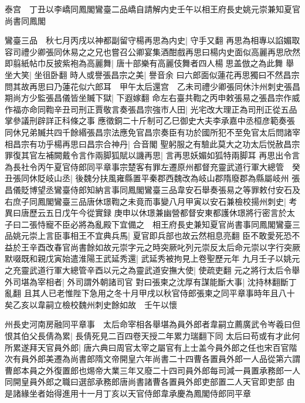 泰宫　丁丑以李嶠同鳳閣鸞臺二品嶠自請解内史壬午以相王府長史姚元崇兼知夏官尚書同鳳閣

鸞臺三品　秋七月丙戌以神都副留守楊再思為内史|{
	守手又翻}
再思為相專以諂媚取容司禮少卿張同休易之之兄也嘗召公卿宴集酒酣戲再思曰楊内史面似高麗再思欣然即翦紙帖巾反披紫袍為高麗舞|{
	唐十部樂有高麗伎舞者四人楊思盖倣之為此舞}
舉坐大笑|{
	坐徂卧翻}
時人或譽張昌宗之美|{
	譽音余}
曰六郎面似蓮花再思獨曰不然昌宗問其故再思曰乃蓮花似六郎耳　甲午太后還宫　乙未司禮少卿張同休汴州刺史張昌期尚方少監張昌儀皆坐贓下獄|{
	下遐嫁翻}
命左右臺共鞫之丙申敕張易之張昌宗作威作福亦命同鞫辛丑司刑正賈敬言奏張昌宗強市人田|{
	光宅改大理正為司刑正從五品掌參議刑辟詳正科條之事}
應徵銅二十斤制可乙巳御史大夫李承嘉中丞桓彦範奏張同休兄弟贓共四千餘緡張昌宗法應免官昌宗奏臣有功於國所犯不至免官太后問諸宰相昌宗有功乎楊再思曰昌宗合神丹|{
	合音閣}
聖躬服之有驗此莫大之功太后悦赦昌宗罪復其官左補闕戴令言作兩脚狐賦以譏再思|{
	言再思妖媚如狐特兩脚耳}
再思出令言為長社令丙午夏官侍郎同平章事宗楚客有罪左遷原州都督充靈武道行軍大總管　癸丑張同休貶岐山丞|{
	後魏分扶風雍縣置平秦郡西魏改為岐山郡隋廢郡為縣屬岐州}
張昌儀貶博望丞鸞臺侍郎知納言事同鳳閣鸞臺三品韋安石舉奏張易之等罪敕付安石及右庶子同鳳閣鸞臺三品唐休璟鞫之未竟而事變八月甲寅以安石兼檢校揚州刺史|{
	考異曰唐歷云五日戊午今從實録}
庚申以休璟兼幽營都督安東都護休璟將行密言於太子曰二張恃寵不臣必將為亂殿下宜備之　相王府長史兼知夏官尚書事同鳳閣鸞臺三品姚元崇上言臣事相王不宜典兵馬|{
	夏官即兵部也故云然相息亮翻}
臣不敢愛死恐不益於王辛酉改春官尚書餘如故元崇字元之時突厥叱列元崇反太后命元崇以字行突厥默啜既和親戊寅始遣淮陽王武延秀還|{
	武延秀被拘見上卷聖歷元年}
九月壬子以姚元之充靈武道行軍大總管辛酉以元之為靈武道安撫大使|{
	使疏吏翻}
元之將行太后令舉外司堪為宰相者|{
	外司謂外朝諸司官}
對曰張柬之沈厚有謀能斷大事|{
	沈持林翻斷丁亂翻}
且其人已老惟陛下急用之冬十月甲戌以秋官侍郎張柬之同平章事時年且八十矣乙亥以韋嗣立檢校魏州刺史餘如故　壬午以懷

州長史河南房融同平章事　太后命宰相各舉堪為員外郎者韋嗣立薦廣武令岑羲曰但恨其伯父長倩為累|{
	長倩死見二百四卷天授二年累力瑞翻下同}
太后曰苟或有才此何所累遂拜天官員外郎|{
	唐六典曰周官太宰之屬官有上士盖今員外郎之任也宋百官階次有員外郎美遷為尚書郎隋文帝開皇六年尚書二十四曹各置員外郎一人品從第六謂曹郎本員之外復置郎也焬帝大業三年又廢二十四司員外郎每司減一員置承務郎一人同開皇員外郎之職曰選部承務郎唐尚書諸曹各置員外郎吏部置二人天官即吏部}
由是諸緣坐者始得進用十一月丁亥以天官侍郎韋承慶為鳳閣侍郎同平章

